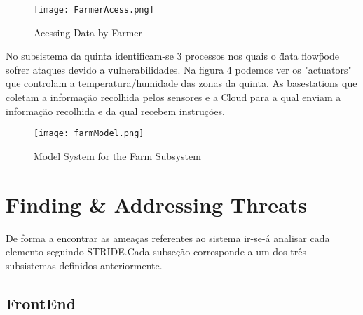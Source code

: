\begin{figure}[h!]

	\centering

 	\texttt{[image: FarmerAcess.png]}

 	\caption {Acessing Data by Farmer}

  	\label{fig03}
\end{figure}

No subsistema da quinta identificam-se 3 processos nos quais o \"data flow\" pode sofrer ataques devido a vulnerabilidades. Na figura 4 podemos ver os "actuators" que controlam a temperatura/humidade das zonas da quinta. As basestations que coletam a informação recolhida pelos sensores e a Cloud para a qual enviam a informação recolhida e da qual recebem instruções.

\begin{figure}[H]

	\centering

 	\texttt{[image: farmModel.png]}

 	\caption {Model System for the Farm Subsystem}

  	\label {fig04}
\end{figure}

\section{Finding \& Addressing Threats}

	De forma a encontrar as ameaças referentes ao sistema ir-se-á analisar cada elemento seguindo STRIDE.Cada subseção corresponde a um dos três subsistemas definidos anteriormente.



\subsection{FrontEnd}

